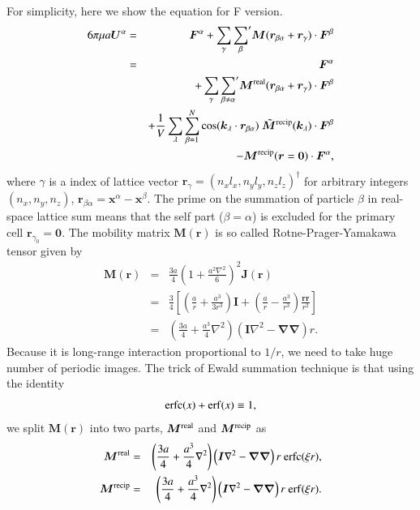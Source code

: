 \documentclass{book}
\begin{document}
For simplicity, here we show the equation for F version.
\begin{eqnarray}
  6\pi\mu a
  \bm{U}^\alpha
  &=&
  \bm{F}^\alpha
  +
  \sum_{\gamma}
  {\sum_{\beta}}'
  \bm{M}(\bm{r}_{\beta\alpha} + \bm{r}_\gamma)
  \cdot\bm{F}^\beta
  \\
  &=&
  \bm{F}^\alpha
  \\
  &&
  +
  \sum_{\gamma}
  {\sum_{\beta\neq\alpha}}'
  \bm{M}^{\rm real}(\bm{r}_{\beta\alpha} + \bm{r}_\gamma)
  \cdot\bm{F}^\beta
  \\
  &&
  +
  \frac{1}{V}
  \sum_{\lambda}
  \sum_{\beta = 1}^{N}
  \cos(\bm{k}_\lambda\cdot\bm{r}_{\beta\alpha})\ 
  \tilde{\bm{M}}^{\rm recip}(\bm{k}_\lambda)
  \cdot\bm{F}^\beta
  \\
  &&
  -
  \bm{M}^{\rm recip}(\bm{r} = \bm{0})
  \cdot\bm{F}^\alpha
  ,
\end{eqnarray}
where $\gamma$ is a index of lattice vector
$\bm{r}_\gamma = (n_x l_x, n_y l_y, n_z l_z)^\dagger$
for arbitrary integers $(n_x, n_y, n_z)$,
$\bm{r}_{\beta\alpha} = \bm{x}^\alpha - \bm{x}^\beta$.
The prime on the summation of particle $\beta$ in real-space lattice sum
means that the self part ($\beta = \alpha$) is excluded
for the primary cell $\bm{r}_{\gamma_0} = \bm{0}$.
The mobility matrix $\bm{M}(\bm{r})$ is so called
Rotne-Prager-Yamakawa tensor given by
\begin{eqnarray}
  \bm{M}(\bm{r})
  &=&
  \frac{3a}{4}
  \left(
    1
    +
    \frac{a^2\nabla^2}{6}
  \right)^2
  \bm{J}(\bm{r})
  \\
  &=&
  \frac{3}{4}
  \left[
  \left(
    \frac{a}{r}
    +
    \frac{a^3}{3r^3}
  \right)
  \bm{I}
  +
  \left(
    \frac{a}{r}
    -
    \frac{a^3}{r^3}
  \right)
  \frac{\bm{rr}}{r^2}
  \right]
  \\
  &=&
  \left(
    \frac{3a}{4}
    +
    \frac{a^3}{4}
    \nabla^2
  \right)
  \left(
    \bm{I}
    \nabla^2
    -
    \bm{\nabla\nabla}
  \right)
  r
  .
\end{eqnarray}
Because it is long-range interaction proportional to $1/r$,
we need to take huge number of periodic images.
The trick of Ewald summation technique is that
using the identity
\begin{equation}
  {\rm erfc}(x) + {\rm erf}(x) \equiv 1,
\end{equation}
we split $\bm{M}(\bm{r})$ into two parts,
$\bm{M}^{\rm real}$ and $\bm{M}^{\rm recip}$ as
\begin{eqnarray}
  \bm{M}^{\rm real}
  &=&
  \left(
    \frac{3a}{4}
    +
    \frac{a^3}{4}
    \nabla^2
  \right)
  \left(
    \bm{I}
    \nabla^2
    -
    \bm{\nabla\nabla}
  \right)
  r\ 
  {\rm erfc} (\xi r),
  \label{eq:xi3-M-real}
  \\
  \bm{M}^{\rm recip}
  &=&
  \left(
    \frac{3a}{4}
    +
    \frac{a^3}{4}
    \nabla^2
  \right)
  \left(
    \bm{I}
    \nabla^2
    -
    \bm{\nabla\nabla}
  \right)
  r\ 
  {\rm erf} (\xi r)
  .
  \label{eq:xi3-M-recip}
\end{eqnarray}
\end{document}
